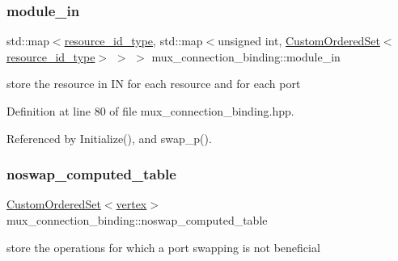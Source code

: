 \mbox{\label{classmux__connection__binding_abe3e45c29632c3aa4629f55195c3990e}} 
\subsubsection{\texorpdfstring{module\+\_\+in}{module\_in}}
{\footnotesize\ttfamily std\+::map$<$\hyperlink{classmux__connection__binding_aa43c7eaf66a55ac97a5a7f57f6149025}{resource\+\_\+id\+\_\+type}, std\+::map$<$unsigned int, \hyperlink{classCustomOrderedSet}{Custom\+Ordered\+Set}$<$\hyperlink{classmux__connection__binding_aa43c7eaf66a55ac97a5a7f57f6149025}{resource\+\_\+id\+\_\+type}$>$ $>$ $>$ mux\+\_\+connection\+\_\+binding\+::module\+\_\+in\hspace{0.3cm}{\ttfamily [private]}}



store the resource in IN for each resource and for each port 



Definition at line 80 of file mux\+\_\+connection\+\_\+binding.\+hpp.



Referenced by Initialize(), and swap\+\_\+p().

\mbox{\label{classmux__connection__binding_a8605219f931f5173519515526515b3bd}} 
\subsubsection{\texorpdfstring{noswap\+\_\+computed\+\_\+table}{noswap\_computed\_table}}
{\footnotesize\ttfamily \hyperlink{classCustomOrderedSet}{Custom\+Ordered\+Set}$<$\hyperlink{graph_8hpp_abefdcf0544e601805af44eca032cca14}{vertex}$>$ mux\+\_\+connection\+\_\+binding\+::noswap\+\_\+computed\+\_\+table\hspace{0.3cm}{\ttfamily [private]}}



store the operations for which a port swapping is not beneficial 




